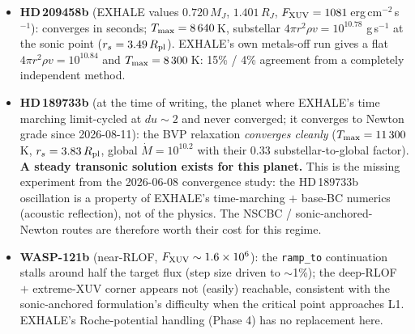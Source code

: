 \documentclass[english,a4paper]{my_memo}
\begin{document}
\begin{itemize}
\item \textbf{HD\,209458b} (EXHALE values $0.720\,M_J$, $1.401\,R_J$,
  $F_{\rm XUV}=1081$\,erg\,cm$^{-2}$\,s$^{-1}$): converges in seconds;
  $T_{\rm max}=8\,640$\,K, substellar $4\pi r^2\rho v = 10^{10.78}$
  g\,s$^{-1}$ at the sonic point ($r_s=3.49\,R_{\rm pl}$). EXHALE's own
  metals-off run gives a flat $4\pi r^2\rho v = 10^{10.84}$ and
  $T_{\rm max}=8\,300$\,K: 15\% / 4\% agreement from a completely
  independent method.
\item \textbf{HD\,189733b} (at the time of writing, the planet where
  EXHALE's time marching limit-cycled at $du\sim2$ and never converged; it
  converges to Newton grade since 2026-08-11): the BVP relaxation
  \emph{converges cleanly} ($T_{\rm max}=11\,300$\,K,
  $r_s=3.83\,R_{\rm pl}$, global $\dot M = 10^{10.2}$ with their 0.33
  substellar-to-global factor). \textbf{A steady transonic solution
  exists for this planet.} This is the missing experiment from the
  2026-06-08 convergence study: the HD\,189733b oscillation is a
  property of EXHALE's time-marching $+$ base-BC numerics (acoustic
  reflection), not of the physics. The NSCBC / sonic-anchored-Newton
  routes are therefore worth their cost for this regime.
\item \textbf{WASP-121b} (near-RLOF, $F_{\rm XUV}\sim1.6\times10^{6}$):
  the \texttt{ramp\_to} continuation stalls around half the target flux
  (step size driven to $\sim$1\%); the deep-RLOF $+$ extreme-XUV corner
  appears not (easily) reachable, consistent with the sonic-anchored
  formulation's difficulty when the critical point approaches L1.
  EXHALE's Roche-potential handling (Phase 4) has no replacement here.
\end{itemize}
\end{document}
